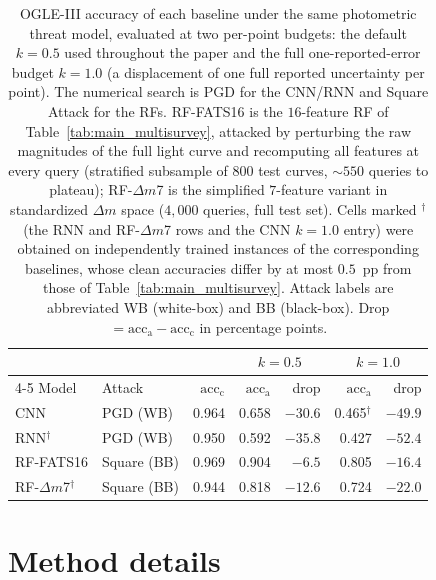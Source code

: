 \documentclass{aa}
\begin{document}
\begin{table}[htbp]
\centering
\caption{OGLE-III accuracy of each baseline under the same photometric threat
model, evaluated at two per-point budgets: the default $k = 0.5$ used
throughout the paper and the full one-reported-error budget
$k = 1.0$ (a displacement of one full reported uncertainty per point).
The numerical search is PGD for the CNN/RNN and Square Attack
\citep{andriushchenko2020square} for the RFs. RF-FATS16 is the
$16$-feature RF of
Table~\ref{tab:main_multisurvey}, attacked by perturbing the raw
magnitudes of the full light curve and recomputing all features at every
query (stratified subsample of $800$ test curves, ${\sim}550$ queries to
plateau); RF-$\Delta m$7 is the simplified $7$-feature variant in
standardized $\Delta m$ space ($4,000$ queries, full test set). Cells marked $^{\dagger}$ (the RNN and
RF-$\Delta m$7 rows and the CNN $k=1.0$ entry) were obtained on
independently trained instances of the corresponding baselines, whose clean
accuracies differ by at most $0.5$~pp from those of
Table~\ref{tab:main_multisurvey}. Attack
labels are abbreviated WB (white-box) and BB (black-box). Drop
$= \mathrm{acc}_{\mathrm{a}} - \mathrm{acc}_{\mathrm{c}}$ in percentage
points.}
\label{tab:targeted_attacks}
\small
\setlength{\tabcolsep}{4pt}
\begin{tabular}{llrrrrr}
\hline
 & & & \multicolumn{2}{c}{$k = 0.5$} & \multicolumn{2}{c}{$k = 1.0$} \\
\cline{4-5}\cline{6-7}
Model & Attack & $\mathrm{acc}_{\mathrm{c}}$ & $\mathrm{acc}_{\mathrm{a}}$ & drop & $\mathrm{acc}_{\mathrm{a}}$ & drop \\
\hline
CNN  & PGD (WB)    & 0.964 & 0.658 & $-30.6$ & 0.465$^{\dagger}$ & $-49.9$ \\
RNN$^{\dagger}$  & PGD (WB)    & 0.950 & 0.592 & $-35.8$ & 0.427 & $-52.4$ \\
RF-FATS16   & Square (BB) & 0.969 & 0.904 & $-6.5$ & 0.805 & $-16.4$ \\
RF-$\Delta m$7$^{\dagger}$   & Square (BB) & 0.944 & 0.818 & $-12.6$ & 0.724 & $-22.0$ \\
\hline
\end{tabular}
\end{table}

\section{Method details}
\label{app:method}
\end{document}
